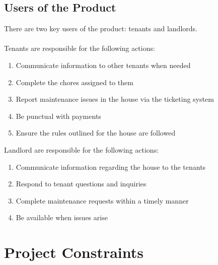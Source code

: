 \documentclass[12pt, titlepage]{article}
\begin{document}
\subsection{Users of the Product}
There are two key users of the product: tenants and landlords. \\ \\
Tenants are responsible for the following actions:
\begin{enumerate}
\item Communicate information to other tenants when needed
\item Complete the chores assigned to them
\item Report maintenance issues in the house via the ticketing system
\item Be punctual with payments
\item Ensure the rules outlined for the house are followed
\end{enumerate}
Landlord are responsible for the following actions:
\begin{enumerate}
\item Communicate information regarding the house to the tenants
\item Respond to tenant questions and inquiries
\item Complete maintenance requests within a timely manner
\item Be available when issues arise
\end{enumerate}


\section{Project Constraints}
\end{document}
